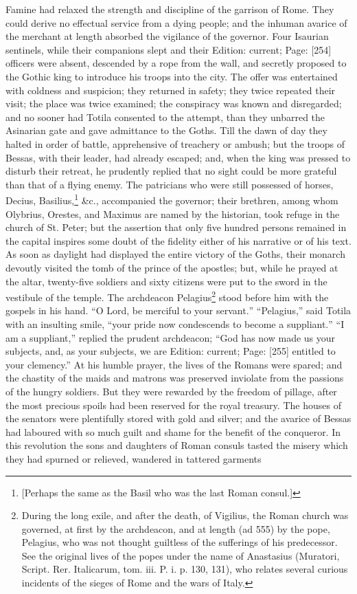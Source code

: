 Famine had relaxed the strength and discipline of the garrison of Rome. They could derive no effectual service from a dying people; and the inhuman avarice of the merchant at length absorbed the vigilance of the governor. Four Isaurian sentinels, while their companions slept and their Edition: current; Page: [254] officers were absent, descended by a rope from the wall, and secretly proposed to the Gothic king to introduce his troops into the city. The offer was entertained with coldness and suspicion; they returned in safety; they twice repeated their visit; the place was twice examined; the conspiracy was known and disregarded; and no sooner had Totila consented to the attempt, than they unbarred the Asinarian gate and gave admittance to the Goths. Till the dawn of day they halted in order of battle, apprehensive of treachery or ambush; but the troops of Bessas, with their leader, had already escaped; and, when the king was pressed to disturb their retreat, he prudently replied that no sight could be more grateful than that of a flying enemy. The patricians who were still possessed of horses, Decius, Basilius,\footnote{[Perhaps the same as the Basil who was the last Roman consul.]} \&c., accompanied the governor; their brethren, among whom Olybrius, Orestes, and Maximus are named by the historian, took refuge in the church of St. Peter; but the assertion that only five hundred persons remained in the capital inspires some doubt of the fidelity either of his narrative or of his text. As soon as daylight had displayed the entire victory of the Goths, their monarch devoutly visited the tomb of the prince of the apostles; but, while he prayed at the altar, twenty-five soldiers and sixty citizens were put to the sword in the vestibule of the temple. The archdeacon Pelagius\footnote{During the long exile, and after the death, of Vigilius, the Roman church was governed, at first by the archdeacon, and at length (ad 555) by the pope, Pelagius, who was not thought guiltless of the sufferings of his predecessor. See the original lives of the popes under the name of Anastasius (Muratori, Script. Rer. Italicarum, tom. iii. P. i. p. 130, 131), who relates several curious incidents of the sieges of Rome and the wars of Italy.} stood before him with the gospels in his hand. \texthebrew{“}O Lord, be merciful to your servant.\texthebrew{” “}Pelagius,\texthebrew{}” said Totila with an insulting smile, \texthebrew{“}your pride now condescends to become a suppliant.\texthebrew{” “}I am a suppliant,\texthebrew{}” replied the prudent archdeacon; \texthebrew{“}God has now made us your subjects, and, as your subjects, we are Edition: current; Page: [255] entitled to your clemency.\texthebrew{}” At his humble prayer, the lives of the Romans were spared; and the chastity of the maids and matrons was preserved inviolate from the passions of the hungry soldiers. But they were rewarded by the freedom of pillage, after the most precious spoils had been reserved for the royal treasury. The houses of the senators were plentifully stored with gold and silver; and the avarice of Bessas had laboured with so much guilt and shame for the benefit of the conqueror. In this revolution the sons and daughters of Roman consuls tasted the misery which they had spurned or relieved, wandered in tattered garments 